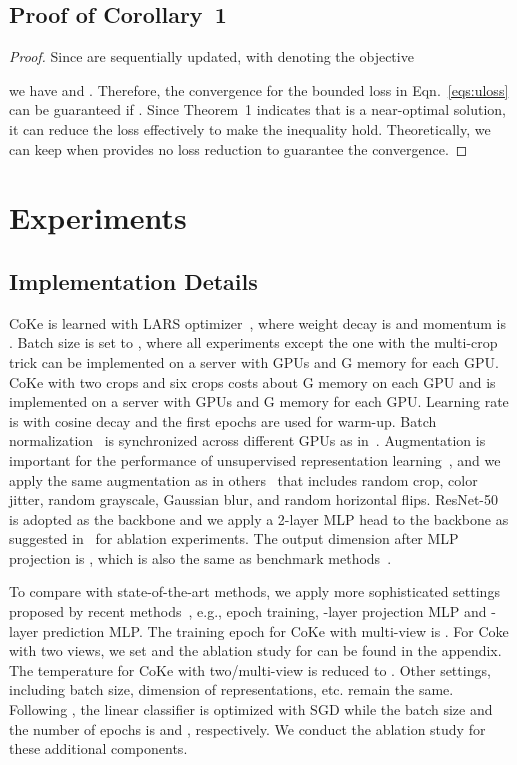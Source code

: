 \documentclass[10pt,twocolumn,letterpaper]{article}
\begin{document}
\subsection{Proof of Corollary~1}
\begin{proof}
Since  are sequentially updated, with  denoting the objective
\begin{scriptsize}

\end{scriptsize}
we have  and . Therefore, the convergence for the bounded loss in Eqn.~\ref{eqs:uloss} can be guaranteed if . Since Theorem~1 indicates that  is a near-optimal solution, it can reduce the loss effectively to make the inequality hold. Theoretically, we can keep  when  provides no loss reduction to guarantee the convergence.
\end{proof}

\section{Experiments}
\subsection{Implementation Details}
CoKe is learned with LARS optimizer~\cite{abs-1708-03888}, where weight decay is  and momentum is . Batch size is set to , where all experiments except the one with the multi-crop trick can be implemented on a server with  GPUs and G memory for each GPU. CoKe with two  crops and six  crops costs about G memory on each GPU and is implemented on a server with  GPUs and G memory for each GPU. Learning rate is  with cosine decay and the first  epochs are used for warm-up. Batch normalization~\cite{IoffeS15} is synchronized across different GPUs as in~\cite{CaronMMGBJ20,ChenK0H20}. Augmentation is important for the performance of unsupervised representation learning~\cite{abs-2003-04297}, and we apply the same augmentation as in others~\cite{CaronMMGBJ20,ChenK0H20} that includes random crop, color jitter, random grayscale, Gaussian blur, and random horizontal flips. ResNet-50~\cite{HeZRS16} is adopted as the backbone and we apply a 2-layer MLP head to the backbone as suggested in~\cite{ChenK0H20,abs-2003-04297} for ablation experiments. The output dimension after MLP projection is , which is also the same as benchmark methods~\cite{CaronMMGBJ20,ChenK0H20,abs-2003-04297}. 

To compare with state-of-the-art methods, we apply more sophisticated settings proposed by recent methods~\cite{GrillSATRBDPGAP20, ChenKSNH20}, e.g.,  epoch training, -layer projection MLP and -layer prediction MLP. The training epoch for CoKe with multi-view is . For Coke with two views, we set  and the ablation study for  can be found in the appendix. The temperature for CoKe with two/multi-view is reduced to . Other settings, including batch size, dimension of representations, etc. remain the same. Following \cite{abs-2104-02057}, the linear classifier is optimized with SGD while the batch size and the number of epochs is  and , respectively. We conduct the ablation study for these additional components.
\end{document}
